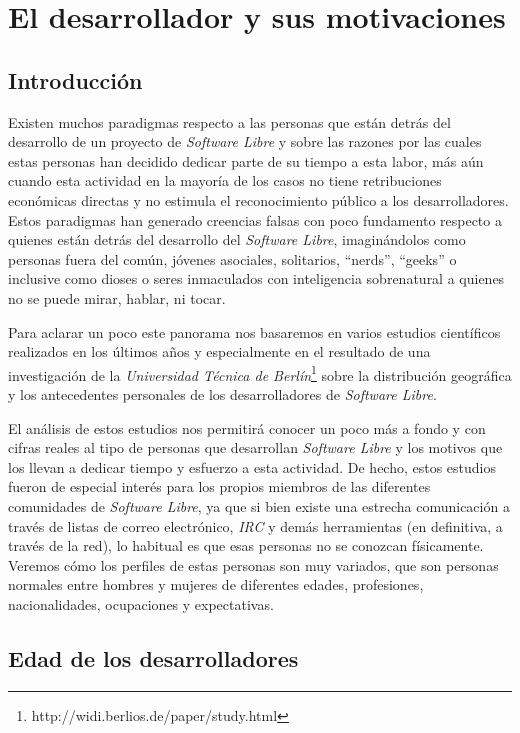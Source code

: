 \chapter{El desarrollador y sus motivaciones}
\label{CHAP3:Developer}
\section{Introducción}

Existen muchos paradigmas respecto a las personas que están detrás del desarrollo de un proyecto de \textit{Software Libre} y sobre las razones por las cuales estas personas han decidido dedicar parte de su tiempo a esta labor, más aún cuando esta actividad en la mayoría de los casos no tiene retribuciones económicas directas y no estimula el reconocimiento público a los desarrolladores. Estos paradigmas han generado creencias falsas con poco fundamento respecto a quienes están detrás del desarrollo del \textit{Software Libre}, imaginándolos como personas fuera del común, jóvenes asociales, solitarios, “nerds”, “geeks” o inclusive como dioses o seres inmaculados con inteligencia sobrenatural a quienes no se puede mirar, hablar, ni tocar.

Para aclarar un poco este panorama nos basaremos en varios estudios científicos realizados en los últimos años y especialmente en el resultado de una investigación de la \textit{Universidad Técnica de Berlín}\footnote{ http://widi.berlios.de/paper/study.html } sobre la distribución geográfica y los antecedentes personales de los desarrolladores de \textit{Software Libre}.

El análisis de estos estudios nos permitirá conocer un poco más a fondo y con cifras reales al tipo de personas que desarrollan \textit{Software Libre} y los motivos que los llevan a dedicar tiempo y esfuerzo a esta actividad. De hecho, estos estudios fueron de especial interés para los propios miembros de las diferentes comunidades de \textit{Software Libre}, ya que si bien existe una estrecha comunicación a través de listas de correo electrónico, \textit{IRC} y demás herramientas (en definitiva, a través de la red), lo habitual es que esas personas no se conozcan físicamente. Veremos cómo los perfiles de estas personas son muy variados, que son personas normales entre hombres y mujeres de diferentes edades, profesiones, nacionalidades, ocupaciones y expectativas.

\section{Edad de los desarrolladores}

